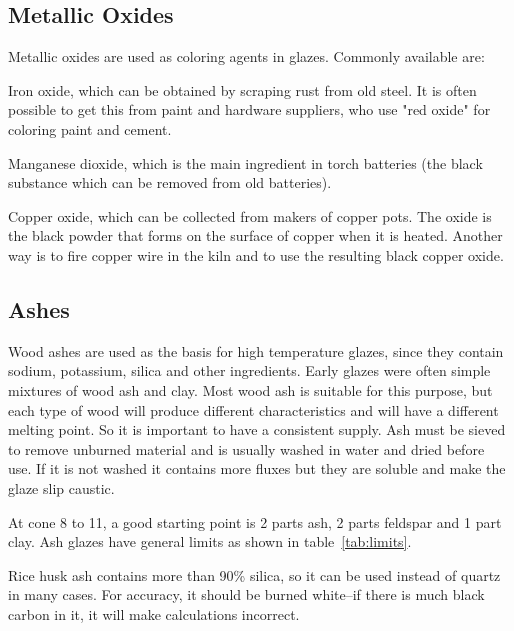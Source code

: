 \subsection{Metallic Oxides}
Metallic oxides are used as coloring agents in glazes. Commonly available are:

Iron oxide, which can be obtained by scraping rust from old steel. It is often 
possible to get this from paint and hardware suppliers, who use "red oxide" for 
coloring paint and cement.

Manganese dioxide, which is the main ingredient in torch batteries (the black 
substance which can be removed from old batteries).

Copper oxide, which can be collected from makers of copper pots. The oxide is 
the black powder that forms on the surface of copper when it is heated. Another 
way is to fire copper wire in the kiln and to use the resulting black copper 
oxide.
\subsection{Ashes}
Wood ashes are used as the basis for high temperature glazes, since they 
contain sodium, potassium, silica and other ingredients. Early glazes were 
often simple mixtures of wood ash and clay. Most wood ash is suitable for this 
purpose, but each type of wood will produce different characteristics and will 
have a different melting point. So it is important to have a consistent supply. 
Ash must be sieved to remove unburned material and is usually washed in water 
and dried before use. If it is not washed it contains more fluxes but they are 
soluble and make the glaze slip caustic.

At cone 8 to 11, a good starting point is 2 parts ash, 2 parts feldspar and 1 
part clay. Ash glazes have general limits as shown in 
table~\ref{tab:limits}.

Rice husk ash contains more than 90\% silica, so it can be used instead of 
quartz in many cases. For accuracy, it should be burned white--if there is 
much black carbon in it, it will make calculations incorrect. 

